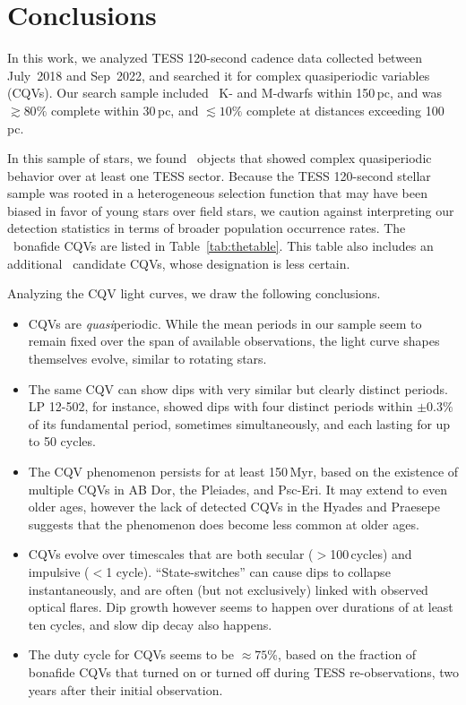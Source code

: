 \documentclass[11pt,twocolumn,tighten]{aastex63}
\begin{document}
\section{Conclusions}
\label{sec:conclusion}

In this work, we analyzed TESS 120-second cadence data collected
between July~2018 and Sep~2022, and searched it for complex
quasiperiodic variables (CQVs).  Our search sample included
\nstarssearched\ K- and M-dwarfs within 150\,pc, and was $\gtrsim
80\%$ complete within 30\,pc, and $\lesssim 10\%$ complete at
distances exceeding 100\,pc.

In this sample of stars, we found \ngoods\ objects that showed complex
quasiperiodic behavior over at least one TESS sector.  Because the
TESS 120-second stellar sample was rooted in a heterogeneous selection
function that may have been biased in favor of young stars over field
stars, we caution against interpreting our detection statistics in
terms of broader population occurrence rates.  The \ngoods\ bonafide
CQVs are listed in Table~\ref{tab:thetable}.  This table also includes
an additional \nmaybes\ candidate CQVs, whose designation is less
certain.

Analyzing the CQV light curves, we draw the following conclusions.

\begin{itemize}
  \item CQVs are {\it quasi}periodic.  While the mean periods in our
    sample seem to remain fixed over the span of available
    observations, the light curve shapes themselves evolve, similar to
    rotating stars.
  \item The same CQV can show dips with very similar but clearly
    distinct periods.  LP 12-502, for instance, showed dips with four
    distinct periods within $\pm 0.3\%$ of its fundamental period,
    sometimes simultaneously, and each lasting for up to 50 cycles.
  \item The CQV phenomenon persists for at least 150\,Myr, based on
    the existence of multiple CQVs in AB Dor, the Pleiades, and
    Psc-Eri.  It may extend to even older ages, however the lack of
    detected CQVs in the Hyades and Praesepe suggests that the
    phenomenon does become less common at older ages.
  \item CQVs evolve over timescales that are both secular
    ($>$100\,cycles) and impulsive ($<$1 cycle).  ``State-switches''
    can cause dips to collapse instantaneously, and are often (but not
    exclusively) linked with observed optical flares.  Dip growth
    however seems to happen over durations of at least ten cycles, and
    slow dip decay also happens.
  \item The duty cycle for CQVs seems to be $\approx 75$\%, based on
    the fraction of bonafide CQVs that turned on or turned off during
    TESS re-observations, two years after their initial observation.
\end{itemize}
\end{document}
